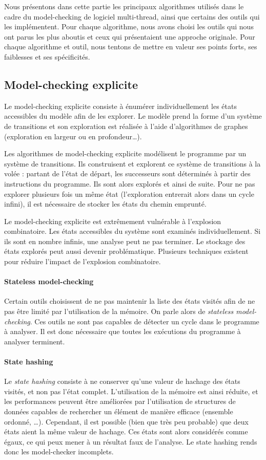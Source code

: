 Nous présentons dans cette partie les principaux algorithmes utilisés dans le
cadre du model-checking de logiciel multi-thread, ainsi que certains des outils
qui les implémentent. Pour chaque algorithme, nous avons choisi les outils qui
nous ont parus les plus aboutis et ceux qui présentaient une approche originale.
Pour chaque algorithme et outil, nous tentons de mettre en valeur ses points
forts, ses faiblesses et ses spécificités.

\subsection{Model-checking explicite}

Le model-checking explicite consiste à énumérer individuellement les
états accessibles du modèle afin de les explorer. Le modèle prend la
forme d'un système de transitions et son exploration est réalisée à
l'aide d'algorithmes de graphes (exploration en largeur ou en
profondeur\dots).

Les algorithmes de model-checking explicite modélisent le programme par un
système de transitions. Ils construisent et explorent ce système de transitions
à la volée : partant de l'état de départ, les successeurs sont déterminés à
partir des instructions du programme. Ils sont alors explorés et ainsi de suite.
Pour ne pas explorer plusieurs fois un même état (l'exploration entrerait alors
dans un cycle infini), il est nécessaire de stocker les états du chemin
emprunté.

Le model-checking explicite est extrêmement vulnérable à l'explosion
combinatoire. Les états accessibles du système sont examinés individuellement.
Si ils sont en nombre infinis, une analyse peut ne pas terminer. Le stockage des
états explorés peut aussi devenir problématique. Plusieurs techniques existent
pour réduire l'impact de l'explosion combinatoire.

\paragraph{Stateless model-checking}
Certain outils choisissent de ne pas maintenir la liste des états
visités afin de ne pas être limité par l'utilisation de la mémoire. On
parle alors de \emph{stateless model-checking}. Ces outils ne sont pas
capables de détecter un cycle dans le programme à analyser. Il est donc
nécessaire que toutes les exécutions du programme à analyser terminent.

\paragraph{State hashing}
Le \emph{state hashing} consiste à ne conserver qu'une valeur de hachage des
états visités, et non pas l'état complet. L'utilisation de la mémoire est ainsi
réduite, et les performances peuvent être améliorées par l'utilisation de
structures de données capables de rechercher un élément de manière efficace
(ensemble ordonné, \dots). Cependant, il est possible (bien que très peu
probable) que deux états aient la même valeur de hachage. Ces états sont alors
considérés comme égaux, ce qui peux mener à un résultat faux de l'analyse.
Le state hashing rends donc les model-checker incomplets.

